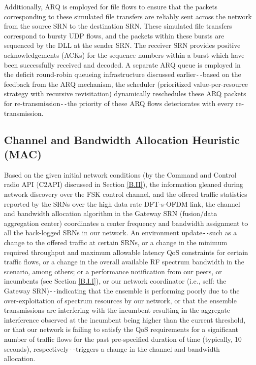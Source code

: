 Additionally, ARQ is employed for file flows to ensure that the packets corresponding to these simulated file transfers are reliably sent across the network from the source SRN to the destination SRN. These simulated file transfers correspond to bursty UDP flows, and the packets within these bursts are sequenced by the DLL at the sender SRN. The receiver SRN provides positive acknowledgements (ACKs) for the sequence numbers within a burst which have been successfully received and decoded. A separate ARQ queue is employed in the deficit round-robin queueing infrastructure discussed earlier\texttt{-{}-}based on the feedback from the ARQ mechanism, the scheduler (prioritized value-per-resource strategy with recursive revisitation) dynamically reschedules these ARQ packets for re-transmission\texttt{-{}-}the priority of these ARQ flows deteriorates with every re-transmission.
\subsection{Channel and Bandwidth Allocation Heuristic (MAC)}\label{B.I.VI}
Based on the given initial network conditions (by the Command and Control radio API (C2API) discussed in Section \ref{B.II}), the information gleaned during network discovery over the FSK control channel, and the offered traffic statistics reported by the SRNs over the high data rate DFT-s-OFDM link, the channel and bandwidth allocation algorithm in the Gateway SRN (fusion/data aggregation center) coordinates a center frequency and bandwidth assignment to all the back-logged SRNs in our network. An environment update\texttt{-{}-}such as a change to the offered traffic at certain SRNs, or a change in the minimum required throughput and maximum allowable latency QoS constraints for certain traffic flows, or a change in the overall available RF spectrum bandwidth in the scenario, among others; or a performance notification from our peers, or incumbents (see Section \ref{B.I.I}), or our network coordinator (i.e., self: the Gateway SRN)\texttt{-{}-}indicating that the ensemble is performing poorly due to the over-exploitation of spectrum resources by our network, or that the ensemble transmissions are interfering with the incumbent resulting in the aggregate interference observed at the incumbent being higher than the current threshold, or that our network is failing to satisfy the QoS requirements for a significant number of traffic flows for the past pre-specified duration of time (typically, 10 seconds), respectively\texttt{-{}-}triggers a change in the channel and bandwidth allocation.


